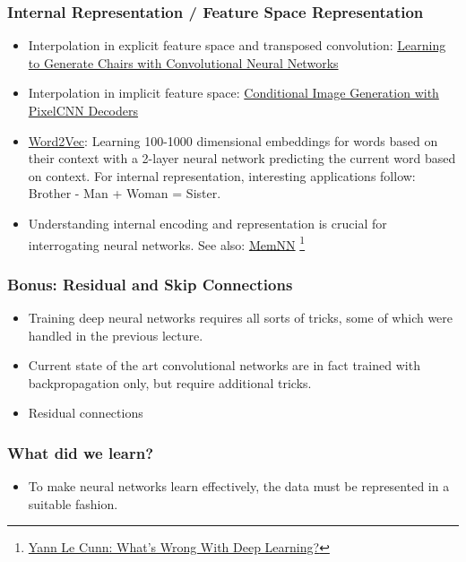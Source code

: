 \documentclass[8pt]{beamer}
\begin{document}
\begin{frame}
\frametitle{Internal Representation / Feature Space Representation}
 \begin{itemize}
  \item Interpolation in explicit feature space and transposed convolution:
        \href{https://www.youtube.com/watch?v=QCSW4isBDL0}{Learning to Generate Chairs with Convolutional Neural Networks}
  \item Interpolation in implicit feature space:
        \href{https://arxiv.org/abs/1606.05328}{Conditional Image Generation with PixelCNN Decoders}
  \item \href{http://deeplearning4j.org/word2vec.html}{Word2Vec}: Learning 100-1000 dimensional embeddings for words based on their context with a 2-layer neural network
        predicting the current word based on context. For internal representation, interesting applications follow: Brother - Man + Woman = Sister.
  \item Understanding internal encoding and representation is crucial for interrogating neural networks. See also: \href{http://arxiv.org/pdf/1410.3916v11.pdf}{MemNN}
        \footnote{\href{http://www.pamitc.org/cvpr15/files/lecun-20150610-cvpr-keynote.pdf}{Yann Le Cunn: What's Wrong With Deep Learning?}}
 \end{itemize}
\end{frame}

\begin{frame}
\frametitle{Bonus: Residual and Skip Connections}
 \begin{itemize}
  \item Training deep neural networks requires all sorts of tricks, some of which were handled in the previous lecture.
  \item Current state of the art convolutional networks are in fact trained with backpropagation only, but require additional tricks.
  \item Residual connections
  {}
 \end{itemize}
\end{frame}

\begin{frame}
\frametitle{What did we learn?}
 \begin{itemize}
  \item To make neural networks learn effectively, the data must be represented in a suitable fashion.
 \end{itemize}
\end{frame}
\end{document}

